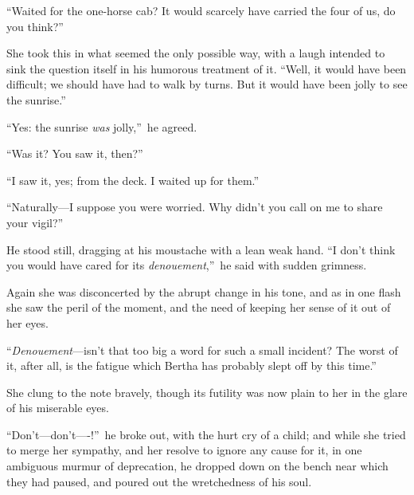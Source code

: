 \documentclass[12pt,a4paper]{book}
\begin{document}
``Waited for the one-horse cab? It would scarcely have carried the
four of us, do you think?''





She took this in what seemed the only possible way, with a laugh
intended to sink the question itself in his humorous treatment of
it. ``Well, it would have been difficult; we should have had to
walk by turns. But it would have been jolly to see the sunrise.''





``Yes: the sunrise \textit{was} jolly,''\ he agreed.





``Was it? You saw it, then?''





``I saw it, yes; from the deck. I waited up for them.''





``Naturally---I suppose you were worried. Why didn't you call on me
to share your vigil?''





He stood still, dragging at his moustache with a lean weak hand. 
``I don't think you would have cared for its \textit{denouement},''\ he said
with sudden grimness.





Again she was disconcerted by the abrupt change in his tone, and
as in one flash she saw the peril of the moment, and the need of
keeping her sense of it out of her eyes.





``\textit{Denouement}---isn't that too big a word for such a small incident? 
The worst of it, after all, is the fatigue which Bertha has
probably slept off by this time.''





She clung to the note bravely, though its futility was now plain
to her in the glare of his miserable eyes.





``Don't---don't----!''\ he broke out, with the hurt cry of a child;
and while she tried to merge her sympathy, and her resolve to
ignore any cause for it, in one ambiguous murmur of deprecation,
he dropped down on the bench near which they had paused, and
poured out the wretchedness of his soul.
\end{document}
